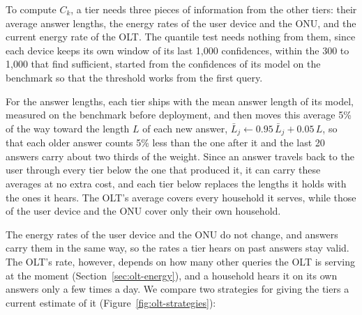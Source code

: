 \documentclass[cic,dipl,english]{infufrgs}
\begin{document}
To compute $C_k$, a tier needs three pieces of information from the other tiers: their average answer
lengths, the energy rates of the user device and the ONU, and the current energy rate of
the OLT. The quantile test needs nothing from them, since each device keeps its own window
of its last 1,000 confidences, within the 300 to 1,000 that 
find sufficient, started from the confidences of its model on the benchmark so that the
threshold works from the first query.

For the answer lengths, each tier ships with the mean answer length of its model, measured
on the benchmark before deployment, and then moves this average 5\% of the way toward the
length $L$ of each new answer, $\bar{L}_j \leftarrow 0.95\,\bar{L}_j + 0.05\,L$, so that each
older answer counts 5\% less than the one after it and the last 20 answers carry about two
thirds of the weight. Since an answer travels back to the user through every tier below the
one that produced it, it can carry these averages at no extra cost, and each tier below
replaces the lengths it holds with the ones it hears. The OLT's average covers every
household it serves, while those of the user device and the ONU cover only their own
household.

The energy rates of the user device and the ONU do not change, and answers carry them in
the same way, so the rates a tier hears on past answers stay valid. The OLT's rate, however,
depends on how many other queries the OLT is serving at the moment
(Section~\ref{sec:olt-energy}), and a household hears it on its own answers only a few
times a day. We compare two strategies for giving the tiers a current estimate of it
(Figure~\ref{fig:olt-strategies}):
\end{document}
